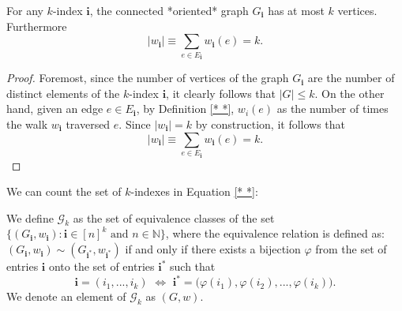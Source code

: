 \begin{lemma}
  \label{lem:graph_walk_le_k}
  \uses{}
  For any $k$-index $\mathbf{i}$, the connected *oriented* graph $G_\mathbf{i}$ has at most $k$ vertices.
  Furthermore
  \[
  |w_\mathbf{i}| \equiv \sum_{e \in E_\mathbf{i}} w_\mathbf{i}(e) = k.
  \]
\end{lemma}
\begin{proof}
  Foremost, since the number of vertices of the graph $G_\mathbf{i}$ 
  are the number of distinct elements of the $k$-index $\mathbf{i}$, it clearly follows that $|G| \leq k$.
  On the other hand, given an edge $e \in E_\mathbf{i}$, by Definition \ref{* *}, $w_i(e)$ as the number of times the walk $w_\mathbf{i}$ traversed $e$. 
  Since $|w_\mathbf{i}| = k$ by construction, it follows that
  \[
  |w_\mathbf{i}| \equiv \sum_{e \in E_\mathbf{i}} w_\mathbf{i}(e) = k.
  \]
\end{proof}
We can count the set of $k$-indexes in Equation \ref{* *}: 
\begin{definition}
  \label{def:g_k}
  \notready
  \uses{}
  We define $\mathcal{G}_k$ as the set of equivalence classes of the set $\{ (G_\mathbf{i},w_\mathbf{i}) : \mathbf{i} \in [n]^k \text{ and } n \in \mathbb{N} \}$, 
  where the equivalence relation is defined as: $(G_\mathbf{i},w_\mathbf{i}) \sim (G_{\mathbf{i}^*},w_{\mathbf{i}^*})$ 
  if and only if there exists a bijection $\varphi$ from the set of entries $\mathbf{i}$ onto the set of entries $\mathbf{i}^*$ such that
  \[
  \mathbf{i} = (i_1,...,i_k) \,\, \Longleftrightarrow \,\, \mathbf{i}^* = \bigl( \varphi(i_1),\varphi(i_2),...,\varphi(i_k) \bigl).
  \]
  We denote an element of $\mathcal{G}_k$ as $(G,w)$.
\end{definition}
